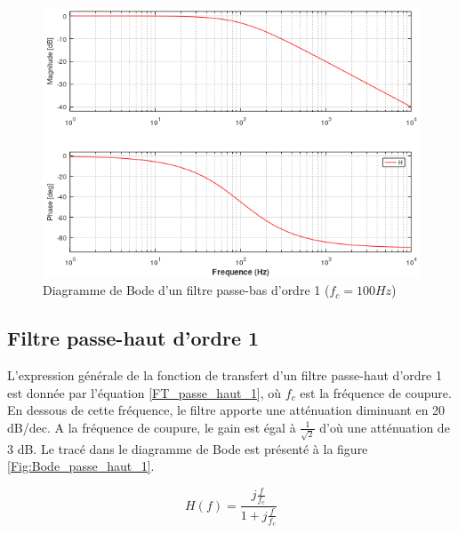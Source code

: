 	\begin{figure}[h!]
		\centering
		\includegraphics[scale=0.7]{images/Bode_passe_bas_1.png}
		\caption{Diagramme de Bode d'un filtre passe-bas d'ordre 1 ($f_{c}=100 Hz$)}	
		\label{Fig:Bode_passe_bas_1} 
	\end{figure}


	\subsection{Filtre passe-haut d'ordre 1}
	L'expression générale de la fonction de transfert d'un filtre passe-haut d'ordre 1 est donnée par l'équation \ref{FT_passe_haut_1}, où $f_{c}$ est la fréquence de coupure. En dessous de cette fréquence, le filtre apporte une atténuation diminuant en 20 dB/dec. A la fréquence de coupure, le gain est égal à $\frac{1}{\sqrt{2}}$ d'où une atténuation de 3 dB. Le tracé dans le diagramme de Bode est présenté à la figure \ref{Fig:Bode_passe_haut_1}.
	
	\begin{equation}\label{FT_passe_haut_1}
	H(f) = \frac{j\frac{f}{f_{c}}}{1+j\frac{f}{f_{c}}}
	\end{equation}
	
